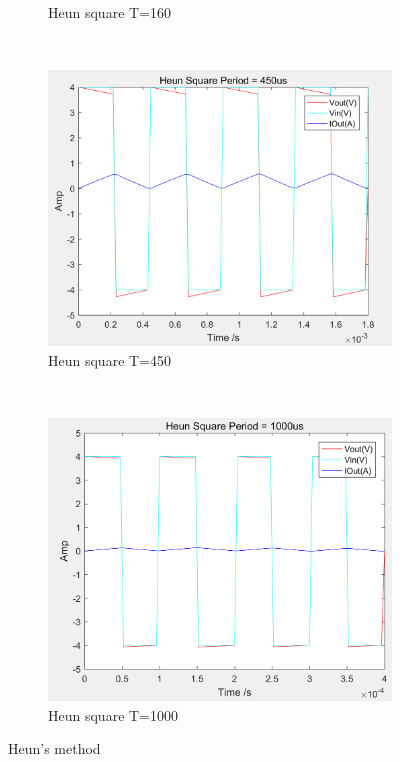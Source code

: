 \documentclass[a4paper, 12pt]{article}
\begin{document}
\begin{figure}[h]
\begin{subfigure}[b]{0.4\textwidth}
            \caption{Heun square T=160}
      \end{subfigure}
       ~
      \begin{subfigure}[b]{0.4\textwidth}
            \includegraphics[width=\textwidth]{ex1/heun_square_450.PNG}
            \caption{Heun square T=450}
      \end{subfigure}
       ~
      \begin{subfigure}[b]{0.4\textwidth}
            \includegraphics[width=\textwidth]{ex1/heun_square_1000.PNG}
            \caption{Heun square T=1000}
      \end{subfigure}
      \caption{Heun's method}
\end{figure}
\end{document}
